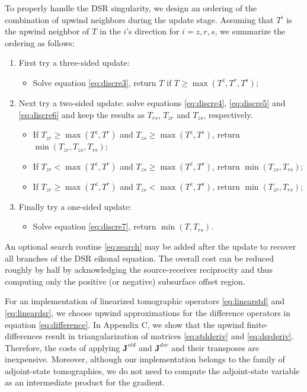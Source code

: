 To properly handle the DSR singularity, we design an ordering of the combination of upwind neighbors during the 
update stage. Assuming that $T^i$ is the upwind neighbor of $T$ in the $i$'s direction for $i = z,r,s$, we 
summarize the ordering as follows:
\begin{enumerate}
\item First try a three-sided update:
\begin{itemize}
\item[] Solve equation \ref{eq:discre3}, return $T$ if $T \geq \max (T^z,T^r,T^s)$;
\end{itemize}
\item Next try a two-sided update: solve equations \ref{eq:discre4}, \ref{eq:discre5} and \ref{eq:discre6} 
and keep the results as $T_{rs}$, $T_{zr}$ and $T_{zs}$, respectively.
\begin{itemize}
\item[] If $T_{zr} \geq \max (T^z,T^r)$ and $T_{zs} \geq \max (T^z,T^s)$, return 
$\min (T_{zr}, T_{zs}, T_{rs})$;
\item[] If $T_{zr} < \max (T^z,T^r)$ and $T_{zs} \geq \max (T^z,T^s)$, return 
$\min (T_{zs}, T_{rs})$;
\item[] If $T_{zr} \geq \max (T^z,T^r)$ and $T_{zs} < \max (T^z,T^s)$, return 
$\min (T_{zr}, T_{rs})$;
\end{itemize}
\item Finally try a one-sided update:
\begin{itemize}
\item[] Solve equation \ref{eq:discre7}, return $\min (T, T_{rs})$.
\end{itemize}
\end{enumerate}
An optional search routine \ref{eq:search} may be added after the update to recover all branches of the DSR 
eikonal equation. The overall cost can be reduced roughly by half by acknowledging the source-receiver 
reciprocity and thus computing only the positive (or negative) subsurface offset region.

For an implementation of linearized tomographic operators \ref{eq:linearstd} and 
\ref{eq:lineardsr}, we choose upwind approximations \cite[]{franklin,li,lelievre} for the difference operators in 
equation \ref{eq:difference}. In Appendix C, we show that the upwind 
finite-differences result in triangularization of matrices \ref{eq:stdderiv} 
and \ref{eq:dsrderiv}. Therefore, the costs of applying $\mathbf{J}^{std}$ and $\mathbf{J}^{dsr}$ and their 
transposes are inexpensive. Moreover, although our implementation belongs to the family of 
adjoint-state tomographies, we do not need to compute the adjoint-state variable as an intermediate product for 
the gradient.

